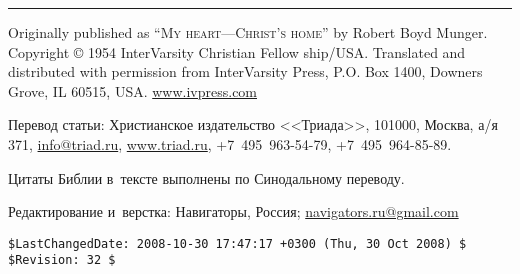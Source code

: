 \documentclass[12pt,article,a4paper,fittopage]{ncc}
\begin{document}
\vspace{0.5cm}
\hrule
\vspace{0.3cm}
\begin{footnotesize}
\noindent
Originally published as \textsc{``My heart---Christ's home''} by Robert Boyd Munger.
Copyright \copyright{} 1954 InterVarsity Christian Fellow\- ship/USA. Translated and
distributed with permission from InterVarsity Press, P.O. Box 1400,
Downers Grove, IL 60515, USA. \url{www.ivpress.com}

\vspace{0.2cm}
\noindent
Перевод статьи: Христианское издательство <<Триада>>, 101000, Москва, а/я 371, \url{info@triad.ru}, 
\linebreak  \url{www.triad.ru},  +7~495~963-54-79, +7~495~964-85-89.

\vspace{0.2cm}
\noindent
Цитаты Библии в~тексте выполнены по Синодальному переводу.

\vspace{0.2cm}
\noindent
Редактирование и~верстка: Навигаторы, Россия; \url{navigators.ru@gmail.com}

\end{footnotesize}
{\tiny 
\begin{verbatim}
$LastChangedDate: 2008-10-30 17:47:17 +0300 (Thu, 30 Oct 2008) $
$Revision: 32 $
\end{verbatim}

}
\end{document}
